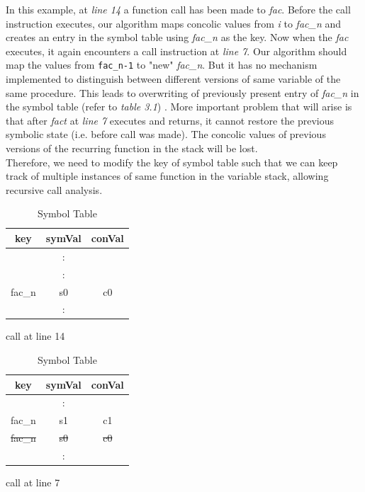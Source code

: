 \documentclass[12pt,oneside]{book}
\begin{document}
In this example, at \textit{line 14} a function call has been made to \textit{fac}. Before the call instruction executes, our algorithm maps concolic values from \textit{i} to \textit{fac\_n} and creates an entry in the symbol table using \textit{fac\_n} as the key. Now when the \textit{fac} executes, it again encounters a call instruction at \textit{line 7}. Our algorithm should map the values from \texttt{fac\_n-1} to "new" \textit{fac\_n}. But it has no mechanism implemented to distinguish between different versions of same variable of the same procedure. This leads to overwriting of previously present entry of \textit{fac\_n} in the symbol table (refer to \textit{table 3.1}) . More important problem that will arise is that after \textit{fact} at \textit{line 7} executes and returns, it cannot restore the previous symbolic state (i.e. before call was made). The concolic values of previous versions of the recurring function in the stack will be lost. \\
Therefore, we need to modify the key of symbol table such that we can keep track of multiple instances of same function in the variable stack, allowing recursive call analysis.



\begin{table}	
\begin{subtable}{.5\linewidth}
\centering
\begin{tabular}{||c c c||} 
 \hline
 \textbf{key} & \textbf{symVal} & \textbf{conVal} \\ [0.5ex] 
 \hline\hline
  & : &   \\ 
  & : &  \\
 \hline
 fac\_n & s0 & c0 \\
 \hline
  & : &  \\ [1ex] 
 \hline
\end{tabular}
\caption{call at line 14}
\end{subtable}%
\begin{subtable}{.5\linewidth}
\centering
 \begin{tabular}{||c c c||} 
 \hline
 \textbf{key} & \textbf{symVal} & \textbf{conVal} \\ [0.5ex] 
 \hline\hline
   & : &   \\ 
  \hline
  fac\_n & s1 & c1 \\
  \st{fac\_n} & \st{s0} & \st{c0} \\
  \hline
  & : &  \\ [1ex] 
 \hline
\end{tabular}
\caption{call at line 7}
\end{subtable}
\caption{Symbol Table} 
\end{table}
\end{document}
